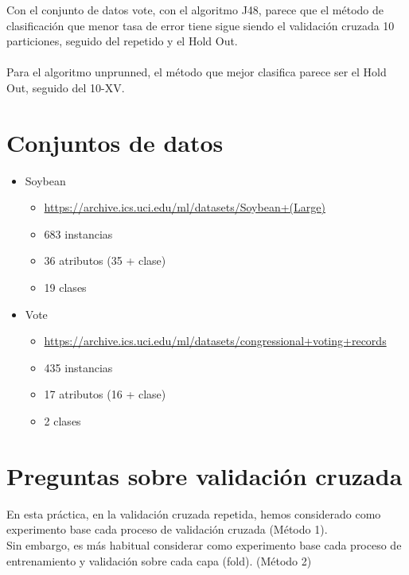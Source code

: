 \documentclass{article}
\begin{document}
Con el conjunto de datos vote, con el algoritmo J48, parece que el método de clasificación que menor tasa de error tiene sigue siendo el validación cruzada 10 particiones, seguido del repetido y el Hold Out.
\\
\\
Para el algoritmo unprunned, el método que mejor clasifica parece ser el Hold Out, seguido del 10-XV.


\newpage

\section{Conjuntos de datos}
\begin{itemize}
	\item Soybean
		\begin{itemize}
			\item \href{https://archive.ics.uci.edu/ml/datasets/Soybean+(Large)}{https://archive.ics.uci.edu/ml/datasets/Soybean+(Large)}
			\item 683 instancias
			\item 36 atributos (35 + clase)
			\item 19 clases
		\end{itemize}	
		
	\item Vote
		\begin{itemize}
			\item \href{https://archive.ics.uci.edu/ml/datasets/congressional+voting+records}{https://archive.ics.uci.edu/ml/datasets/congressional+voting+records}
			\item 435 instancias
			\item 17 atributos (16 + clase)
			\item 2 clases
		\end{itemize}			 	
\end{itemize}

\vspace{1cm}

\section{Preguntas sobre validación cruzada}
En esta práctica, en la validación cruzada repetida, hemos
considerado como experimento base cada proceso de validación
cruzada (Método 1).
\\
Sin embargo, es más habitual considerar como experimento base
cada proceso de entrenamiento y validación sobre cada capa (fold).
(Método 2)\\
\\
\end{document}
